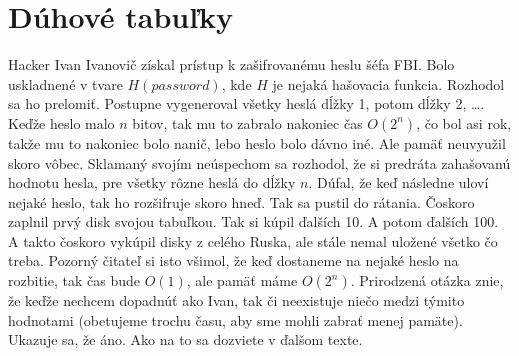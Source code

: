 \section{Dúhové tabuľky}

Hacker Ivan Ivanovič získal prístup k zašifrovanému heslu šéfa FBI. Bolo uskladnené v tvare
$H(password)$, kde $H$ je nejaká hašovacia funkcia. Rozhodol sa ho prelomiť.
Postupne vygeneroval všetky heslá dĺžky 1, potom dĺžky 2, \dots. Keďže heslo malo $n$ bitov, tak
mu to zabralo nakoniec čas $O(2^n)$, čo bol asi rok, takže mu to nakoniec bolo nanič, lebo heslo bolo dávno iné.
 Ale pamäť neuvyužil skoro vôbec. Sklamaný svojím neúspechom sa rozhodol, že si 
predráta zahašovanú hodnotu hesla, pre všetky rôzne heslá do dĺžky $n$. Dúfal, že
keď následne uloví nejaké heslo, tak ho rozšifruje skoro hneď.  Tak sa pustil do rátania.
Čoskoro zaplnil prvý disk svojou tabuľkou. Tak si kúpil ďalších 10. A potom ďalších 100.
A takto čoskoro vykúpil disky z celého Ruska, ale stále nemal uložené všetko čo treba.
Pozorný čitateľ si isto všimol, že keď dostaneme na nejaké heslo na rozbitie, tak čas
bude $O(1)$, ale pamäť máme $O(2^n)$. Prirodzená otázka znie, že keďže nechcem dopadnúť ako Ivan, tak
či neexistuje niečo medzi týmito hodnotami (obetujeme trochu času, aby sme mohli zabrať menej pamäte).
Ukazuje sa, že áno. Ako na to sa dozviete v ďalšom texte.
